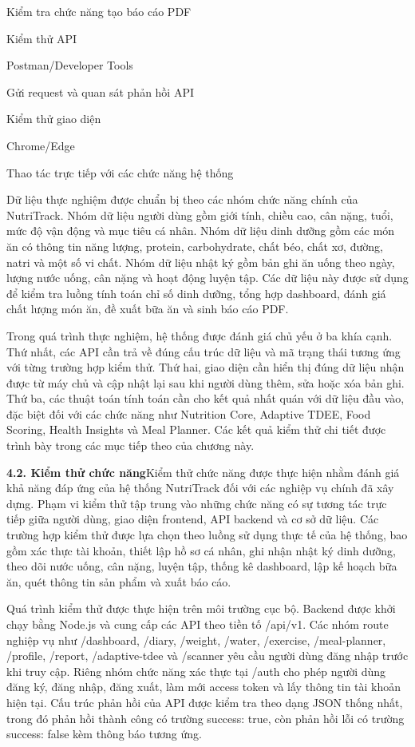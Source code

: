 Kiểm tra chức năng tạo báo cáo PDF

Kiểm thử API

Postman/Developer Tools

Gửi request và quan sát phản hồi API

Kiểm thử giao diện

Chrome/Edge

Thao tác trực tiếp với các chức năng hệ thống

Dữ liệu thực nghiệm được chuẩn bị theo các nhóm chức năng chính của NutriTrack. Nhóm dữ liệu người dùng gồm giới tính, chiều cao, cân nặng, tuổi, mức độ vận động và mục tiêu cá nhân. Nhóm dữ liệu dinh dưỡng gồm các món ăn có thông tin năng lượng, protein, carbohydrate, chất béo, chất xơ, đường, natri và một số vi chất. Nhóm dữ liệu nhật ký gồm bản ghi ăn uống theo ngày, lượng nước uống, cân nặng và hoạt động luyện tập. Các dữ liệu này được sử dụng để kiểm tra luồng tính toán chỉ số dinh dưỡng, tổng hợp dashboard, đánh giá chất lượng món ăn, đề xuất bữa ăn và sinh báo cáo PDF.

Trong quá trình thực nghiệm, hệ thống được đánh giá chủ yếu ở ba khía cạnh. Thứ nhất, các API cần trả về đúng cấu trúc dữ liệu và mã trạng thái tương ứng với từng trường hợp kiểm thử. Thứ hai, giao diện cần hiển thị đúng dữ liệu nhận được từ máy chủ và cập nhật lại sau khi người dùng thêm, sửa hoặc xóa bản ghi. Thứ ba, các thuật toán tính toán cần cho kết quả nhất quán với dữ liệu đầu vào, đặc biệt đối với các chức năng như Nutrition Core, Adaptive TDEE, Food Scoring, Health Insights và Meal Planner. Các kết quả kiểm thử chi tiết được trình bày trong các mục tiếp theo của chương này.

\textbf{4.2. Kiểm thử chức năng}Kiểm thử chức năng được thực hiện nhằm đánh giá khả năng đáp ứng của hệ thống NutriTrack đối với các nghiệp vụ chính đã xây dựng. Phạm vi kiểm thử tập trung vào những chức năng có sự tương tác trực tiếp giữa người dùng, giao diện frontend, API backend và cơ sở dữ liệu. Các trường hợp kiểm thử được lựa chọn theo luồng sử dụng thực tế của hệ thống, bao gồm xác thực tài khoản, thiết lập hồ sơ cá nhân, ghi nhận nhật ký dinh dưỡng, theo dõi nước uống, cân nặng, luyện tập, thống kê dashboard, lập kế hoạch bữa ăn, quét thông tin sản phẩm và xuất báo cáo.

Quá trình kiểm thử được thực hiện trên môi trường cục bộ. Backend được khởi chạy bằng Node.js và cung cấp các API theo tiền tố /api/v1. Các nhóm route nghiệp vụ như /dashboard, /diary, /weight, /water, /exercise, /meal-planner, /profile, /report, /adaptive-tdee và /scanner yêu cầu người dùng đăng nhập trước khi truy cập. Riêng nhóm chức năng xác thực tại /auth cho phép người dùng đăng ký, đăng nhập, đăng xuất, làm mới access token và lấy thông tin tài khoản hiện tại. Cấu trúc phản hồi của API được kiểm tra theo dạng JSON thống nhất, trong đó phản hồi thành công có trường success: true, còn phản hồi lỗi có trường success: false kèm thông báo tương ứng.

